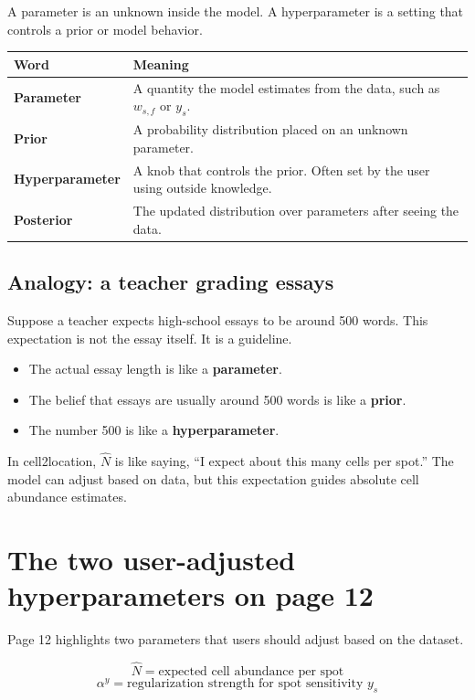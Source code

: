 \documentclass[11pt]{article}
\newcommand{\term}[1]{\textbf{#1}}
\begin{document}
A parameter is an unknown inside the model. A hyperparameter is a setting that controls a prior or model behavior.

\begin{center}
\begin{tabularx}{0.95\textwidth}{>{\bfseries}p{}X}
\toprule
Word & Meaning \\
\midrule
Parameter & A quantity the model estimates from the data, such as $w_{s,f}$ or $y_s$. \\
Prior & A probability distribution placed on an unknown parameter. \\
Hyperparameter & A knob that controls the prior. Often set by the user using outside knowledge. \\
Posterior & The updated distribution over parameters after seeing the data. \\
\bottomrule
\end{tabularx}
\end{center}

\subsection{Analogy: a teacher grading essays}

Suppose a teacher expects high-school essays to be around 500 words. This expectation is not the essay itself. It is a guideline.

\begin{itemize}
  \item The actual essay length is like a \term{parameter}.
  \item The belief that essays are usually around 500 words is like a \term{prior}.
  \item The number 500 is like a \term{hyperparameter}.
\end{itemize}

In cell2location, $\hat N$ is like saying, ``I expect about this many cells per spot.'' The model can adjust based on data, but this expectation guides absolute cell abundance estimates.

\section{The two user-adjusted hyperparameters on page 12}

Page 12 highlights two parameters that users should adjust based on the dataset.

\begin{mathbox}
\[
\boxed{\hat N = \text{expected cell abundance per spot}}
\]
\[
\boxed{\alpha^y = \text{regularization strength for spot sensitivity } y_s}
\]
\end{mathbox}
\end{document}
